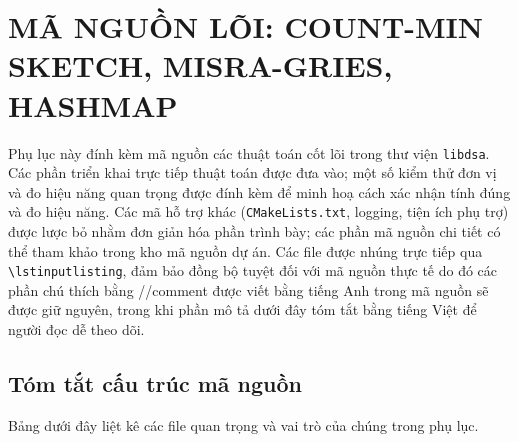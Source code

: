 
\chapter{MÃ NGUỒN LÕI: COUNT-MIN SKETCH, MISRA-GRIES, HASHMAP}
\label{app:code}

Phụ lục này đính kèm mã nguồn các thuật toán cốt lõi trong thư viện \texttt{libdsa}. Các phần triển khai trực tiếp thuật toán được đưa vào; một số kiểm thử đơn vị và đo hiệu năng quan trọng được đính kèm để minh hoạ cách xác nhận tính đúng và đo hiệu năng. Các mã hỗ trợ khác (\texttt{CMakeLists.txt}, logging, tiện ích phụ trợ) được lược bỏ nhằm đơn giản hóa phần trình bày; các phần mã nguồn chi tiết có thể tham khảo trong kho mã nguồn dự án. Các file được nhúng trực tiếp qua \texttt{\textbackslash lstinputlisting}, đảm bảo đồng bộ tuyệt đối với mã nguồn thực tế do đó các phần chú thích bằng //comment được viết bằng tiếng Anh trong mã nguồn sẽ được giữ nguyên, trong khi phần mô tả dưới đây tóm tắt bằng tiếng Việt để người đọc dễ theo dõi.

\section{Tóm tắt cấu trúc mã nguồn}

Bảng dưới đây liệt kê các file quan trọng và vai trò của chúng trong phụ lục.

